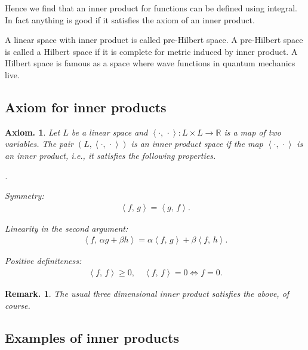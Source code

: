 \documentclass[openany, a4paper, oneside]{jsbook}
\newcounter{enum2}
\renewenvironment{enumerate}{%
\begin{list}%
{%
\arabic{enum2}.\ \,%
}%
{%
\usecounter{enum2}
\setlength{\itemindent}{0pt}%
\setlength{\leftmargin}{15pt}%
\setlength{\rightmargin}{0pt}%
\setlength{\labelsep}{0pt}%
\setlength{\labelwidth}{6pt}%
\setlength{\itemsep}{0pt}%
\setlength{\parsep}{0pt}%
\setlength{\listparindent}{0pt}%
}
}{%
\end{list}%
}
\theoremstyle{break}
\newtheorem{axm}[thm]{Axiom.}
\theoremstyle{breakdefn}
\newtheorem{rem}[thm]{Remark.}
\newcommand{\rbk}[1]{\left (#1\right)}
\newcommand{\bkt}[2]{\left\langle#1,\,#2\right\rangle}
\newcommand{\bbR}{\mathbb{R}}
\begin{document}
Hence we find that an inner product for functions
can be defined using integral.
In fact anything is good if it satisfies the axiom of an inner product.

A linear space with inner product is called pre-Hilbert space.
A pre-Hilbert space is called a Hilbert space if it is complete for metric induced by inner product.
A Hilbert space is famous as a space where wave functions in quantum mechanics live.
\subsection{Axiom for inner products}


\begin{axm}
 Let $L$ be a linear space and $\bkt{\cdot}{\cdot} \colon L \times L \to \bbR$ is a map of two variables.
 The pair $\rbk{L, \bkt{\cdot}{\cdot}}$ is an inner product space if the map $\bkt{\cdot}{\cdot}$ is an inner product,
 i.e., it satisfies the following properties.
\begin{enumerate}
\item Symmetry:
  \begin{align}
   \bkt{f}{g} = \bkt{g}{f}.
  \end{align}
\item Linearity in the second argument:
  \begin{align}
   \bkt{f}{\alpha g + \beta h}
   =
   \alpha \bkt{f}{g} + \beta \bkt{f}{h}.
  \end{align}
\item Positive definiteness:
  \begin{align}
   \bkt{f}{f} \geq 0, \quad
   \bkt{f}{f} = 0 \Longleftrightarrow f = 0.
  \end{align}
\end{enumerate}
\end{axm}
\begin{rem}
 The usual three dimensional inner product satisfies the above, of course.
\end{rem}
\subsection{Examples of inner products}
\end{document}
